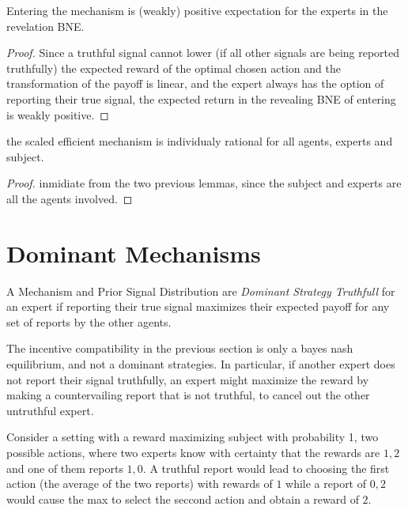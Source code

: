 \begin{lem}
	Entering the mechanism is (weakly) positive expectation for the experts in the revelation BNE.
\end{lem}

\begin{proof}
Since a truthful signal cannot lower (if all other signals are being reported truthfully) the expected reward of the optimal chosen action and the transformation of the payoff is linear, and the expert always has the option of reporting their true signal, the expected return in the revealing BNE of entering is weakly positive.
\end{proof}


\begin{thm}
	the scaled efficient mechanism is individualy rational for all agents, experts and subject.
\end{thm}

\begin{proof}
inmidiate from the two previous lemmas, since the subject and experts are all the agents involved.
\end{proof}




\section{Dominant Mechanisms}

\begin{defn}
	A Mechanism and Prior Signal Distribution are \emph{Dominant Strategy Truthfull} for an expert if reporting their true signal maximizes their expected payoff for any set of reports by the other agents. 
\end{defn}

The incentive compatibility in the previous section is only a bayes nash equilibrium, and not a dominant strategies. In particular, if another expert does not report their signal truthfully, an expert might maximize the reward by making a countervailing report that is not truthful, to cancel out the other untruthful expert. 

\begin{eg}
	Consider a setting with a reward maximizing subject with probability 1, two possible actions, where two experts know with certainty that the rewards are $1,2$ and one of them reports $1,0$. A truthful report would lead to choosing the first action (the average of the two reports) with rewards of $1$ while a report of $0,2$ would cause the max to select the seccond action and obtain a reward of $2$.
\end{eg}



